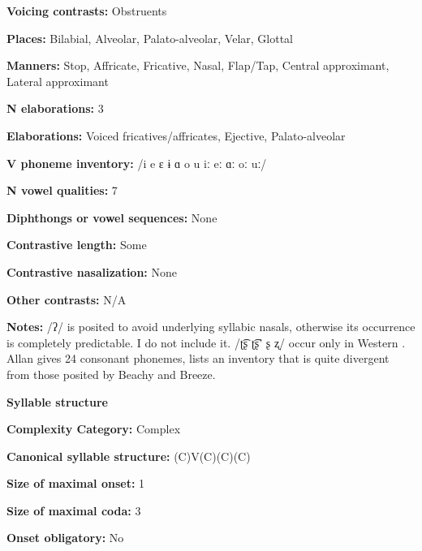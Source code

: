 \textbf{Voicing contrasts:} Obstruents



\textbf{Places:} Bilabial, Alveolar, Palato-alveolar, Velar, Glottal



\textbf{Manners:} Stop, Affricate, Fricative, Nasal, Flap/Tap, Central approximant, Lateral approximant



\textbf{N elaborations:} 3



\textbf{Elaborations:} Voiced fricatives/affricates, Ejective, Palato-alveolar



\textbf{V phoneme inventory:} /i e ɛ ɨ ɑ o u iː eː ɑː oː uː/



\textbf{N vowel qualities:} 7



\textbf{Diphthongs or vowel sequences:} None



\textbf{Contrastive length:} Some



\textbf{Contrastive nasalization:} None



\textbf{Other contrasts:} N/A



\textbf{Notes:} /ʔ/ is posited to avoid underlying syllabic nasals, otherwise its occurrence is completely predictable. I do not include it. /ʈ͡ʂ ʈ͡ʂ’ ʂ ʐ/ occur only in Western  \citep{Beach2005}. Allan gives 24 consonant phonemes, lists an inventory that is quite divergent from those posited by Beachy and Breeze.



\textbf{Syllable structure}



\textbf{Complexity Category:} Complex



\textbf{Canonical syllable structure:} (C)V(C)(C)(C) \citep[38-46]{Beachy2005}



\textbf{Size of maximal onset:} 1



\textbf{Size of maximal coda:} 3



\textbf{Onset obligatory:} No




